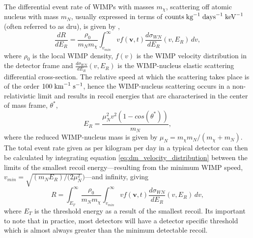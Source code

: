 The differential event rate of WIMPs with masses $m_{\chi}$, scattering off atomic nucleus with mass $m_{N}$, usually expressed in terms of $\text{counts} \; \text{kg}^{-1} \; \text{days}^{-1} \; \text{keV}^{-1}$ (often referred to as dru), is given by \cite{Bertone_book},
%
\begin{equation} \label{eq:dm_velocity_distribution}
    \frac{dR}{dE_{R}} = \frac{\rho_{0}}{m_{N} m_{\chi}} \int_{v_{min}}^{\infty} vf(\boldsymbol{v}, t) \frac{d\sigma_{WN}}{dE_{R}}(v, E_{R}) \, dv, 
\end{equation}
%
where $\rho_{0}$ is the local WIMP density, $f(v)$ is the WIMP velocity distribution in the detector frame and $\frac{d\sigma_{WN}}{dE_{R}}(v, E_{R})$ is the WIMP-nucleus elastic scattering differential cross-section. The relative speed at which the scattering takes place is of the order $100 \; \text{km}^{-1} \; \text{s}^{-1}$, hence the WIMP-nucleus scattering occurs in a non-relativistic limit and results in recoil energies that are characterised in the center of mass frame, $\theta^{\ast}$,
%
\begin{equation} \label{eq:cm_wimp_energy}
    E_{R} = \frac{\mu^{2}_{N}v^{2}(1-cos(\theta^{\ast}))}{m_{N}},
\end{equation}
%
where the reduced WIMP-nucleus mass is given by $\mu_{N} = m_{\chi}m_{N}/(m_{\chi} + m_{N})$. The total event rate given as per kilogram per day in a typical detector can then be calculated by integrating equation \ref{eq:dm_velocity_distribution} between the limits of the smallest recoil energy---resulting from the minimum WIMP speed, $v_{min} = \sqrt{(m_{N}E_{R})/(2\mu^{2}_{N}})$---and infinity, giving 
%
\begin{equation} \label{eq:dm_velocity_distribution}
    R = \int_{E_{T}}^{\infty} \frac{\rho_{0}}{m_{N} m_{\chi}} \int_{v_{min}}^{\infty} vf(\boldsymbol{v}, t) \frac{d\sigma_{WN}}{dE_{R}}(v, E_{R}) \, dv, 
\end{equation}
%
where $E_{T}$ is the threshold energy as a result of the smallest recoil. Its important to note that in practice, most detectors will have a detector specific threshold which is almost always greater than the minimum detectable recoil. 

